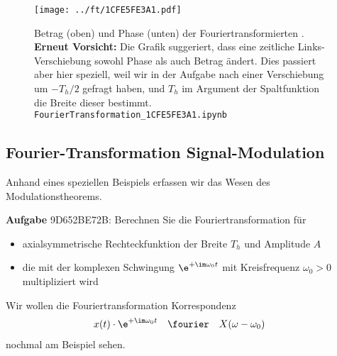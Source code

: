 %
\begin{figure}[h!]
\texttt{[image: ../ft/1CFE5FE3A1.pdf]}
  \caption{Betrag (oben) und Phase (unten) der Fouriertransformierten .
\textbf{Erneut Vorsicht:} Die Grafik suggeriert, dass eine zeitliche Links-Verschiebung
sowohl Phase als auch Betrag ändert. Dies passiert aber hier speziell, weil wir in der
Aufgabe nach einer Verschiebung um $-T_h/2$ gefragt haben, und $T_h$
im Argument der Spaltfunktion die Breite dieser bestimmt.
\texttt{FourierTransformation\_1CFE5FE3A1.ipynb}}
  \label{fig:1CFE5FE3A1}
\end{figure}





\clearpage
\subsection{Fourier-Transformation Signal-Modulation}
\label{sec:9D652BE72B}
\begin{Ziel}
Anhand eines speziellen Beispiels erfassen wir das Wesen des Modulationstheorems.
\end{Ziel}
\textbf{Aufgabe} {\tiny 9D652BE72B}: Berechnen Sie die Fouriertransformation für
\begin{itemize}
\item axialsymmetrische Rechteckfunktion der Breite $T_h$ und Amplitude $A$
\item die mit der komplexen Schwingung $\e^{+\im \omega_0 t}$ mit Kreisfrequenz $\omega_0>0$
multipliziert wird
\end{itemize}
Wir wollen die Fouriertransformation Korrespondenz 
\begin{align}
x(t) \cdot \e^{+\im\omega_0 t} & \quad \fourier \quad X(\omega-\omega_0)
\end{align}
nochmal am Beispiel sehen.

\begin{figure}[h!]
\centering
{}
\end{figure}

